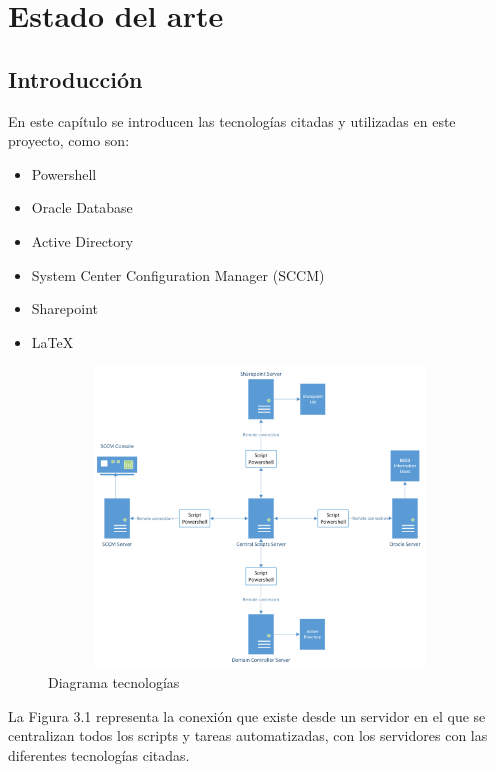 \documentclass[a4paper, 12pt]{book}
\begin{document}
\cleardoublepage

\chapter{Estado del arte}
\label{chap:estado}

\section{Introducción}
\label{sec:Introducción}

En este capítulo se introducen las tecnologías citadas y utilizadas en este proyecto, como son:

\begin{itemize}
\item Powershell

\item Oracle Database

\item Active Directory

\item System Center Configuration Manager (SCCM)

\item Sharepoint

\item LaTeX
\end{itemize}

\begin{figure}[H]
	\centering
	\includegraphics[width=15cm, height=8cm, keepaspectratio]{img/Diagrama_tecnologias.png}
	\caption{Diagrama tecnologías}
	\label{fig:Diagrama_tecnologias}
\end{figure}

La Figura 3.1 representa la conexión que existe desde un servidor en el que se centralizan todos los scripts y tareas automatizadas, con los servidores con las diferentes tecnologías citadas.
\end{document}
